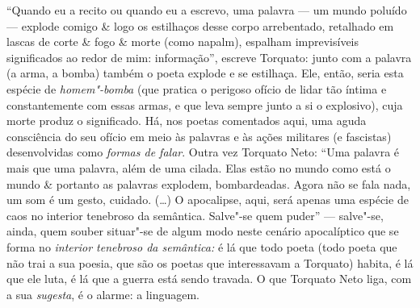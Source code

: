 ``Quando eu a recito ou quando eu a escrevo, uma palavra --- um mundo
poluído --- explode comigo \& logo os estilhaços desse corpo arrebentado,
retalhado em lascas de corte \& fogo \& morte (como napalm), espalham
imprevisíveis significados ao redor de mim: informação'', escreve
Torquato: junto com a palavra (a arma, a bomba) também o poeta explode e
se estilhaça. Ele, então, seria esta espécie de \emph{homem"-bomba} (que
pratica o perigoso ofício de lidar tão íntima e constantemente com essas
armas, e que leva sempre junto a si o explosivo), cuja morte produz o
significado. Há, nos poetas comentados aqui, uma aguda consciência do
seu ofício em meio às palavras e às ações militares (e fascistas)
desenvolvidas como \emph{formas de falar}. Outra vez Torquato Neto: ``Uma
palavra é mais que uma palavra, além de uma cilada. Elas estão no mundo
como está o mundo \& portanto as palavras explodem, bombardeadas. Agora
não se fala nada, um som é um gesto, cuidado. (\ldots{}) O apocalipse, aqui,
será apenas uma espécie de caos no interior tenebroso da semântica.
Salve"-se quem puder'' --- salve"-se, ainda, quem souber situar"-se de algum
modo neste cenário apocalíptico que se forma no \emph{interior tenebroso
da semântica:} é lá que todo poeta (todo poeta que não trai a sua
poesia, que são os poetas que interessavam a Torquato) habita, é lá que
ele luta, é lá que a guerra está sendo travada. O que Torquato Neto
liga, com a sua \emph{sugesta}, é o alarme: a linguagem.

\pagebreak


